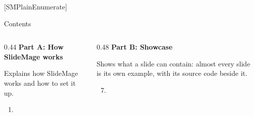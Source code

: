 
\providecommand{\SMManualPartASections}{6}
\edef\SMManualPartBStart{\number\numexpr\SMManualPartASections+1\relax}
[SMPlainEnumerate]
\begin{standardframe}{Contents}
	\small
	\SMDeckAgenda
	\par\medskip
	\begin{columns}[t,onlytextwidth]
		\begin{column}{0.44\linewidth}
			\textcolor{c_primary_highlight}{\textbf{Part A: How SlideMage works}}\par\smallskip
			\parbox[t][3\baselineskip][t]{\linewidth}{Explains how SlideMage works and how to set it up.\strut}\par\smallskip\prevdepth=0pt
			\begin{enumerate}
				\tableofcontents[sections={1-\SMManualPartASections},hideallsubsections]
				\ifnum\value{enumi}=0 \item[] \fi
			\end{enumerate}
		\end{column}
		\begin{column}{0.48\linewidth}
			\textcolor{c_primary_highlight}{\textbf{Part B: Showcase}}\par\smallskip
			\parbox[t][3\baselineskip][t]{\linewidth}{Shows what a slide can contain: almost every slide is its own example, with its source code beside it.\strut}\par\smallskip\prevdepth=0pt
			\begin{enumerate}
				\setcounter{enumi}{\SMManualPartASections}
				\tableofcontents[sections={\SMManualPartBStart-12},hideallsubsections]
				\ifnum\value{enumi}=\SMManualPartASections\relax \item[] \fi
			\end{enumerate}
		\end{column}
	\end{columns}
\end{standardframe}
